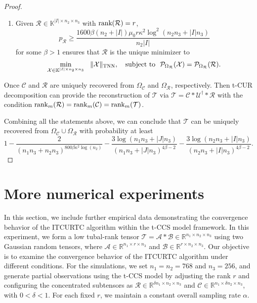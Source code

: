 \documentclass[twoside,12pt]{article}
\newcommand{\TNN}{\textnormal{TNN}}
\def\rank{\textnormal{rank}}
\def\rank{\textnormal{rank}}
\begin{document}
\begin{proof}
\begin{enumerate}[label=\roman*),leftmargin=.5in]
 \item Given $\mathcal{R}\in\mathbb{K}^{|I|\times n_2\times n_3}$ with $\rank(\mathcal{R})=r$, 
 \[p_{\mathcal{R}} \geq \frac{1600\beta(n_2+|I|)\mu_0r\kappa^2\log^2(n_2n_3+|I|n_3)}{n_2|I|}\] for some $\beta>1$ ensures that 
 $\mathcal{R}$ is the unique minimizer to 
\begin{align*}
\min_{\mathcal{X}\in\mathbb{K}^{|I|\times n_2\times n_3}}~~\|\mathcal{X}\|_{\TNN},~~\text { subject to }~ \mathcal{P}_{\Omega_{\mathcal{R}}}(\mathcal{X})=\mathcal{P}_{\Omega_{\mathcal{R}}}(\mathcal{R}).
\end{align*}
\end{enumerate}
Once $\mathcal{C}$ and $\mathcal{R}$ are uniquely recovered from $\Omega_\mathcal{C}$ and $\Omega_{\mathcal{R}}$, respectively. Then t-CUR decomposition can provide the reconstruction of $\mathcal{T}$ via $\mathcal{T}=\mathcal{C}*\mathcal{U}^\dagger*\mathcal{R}$ with the condition $\rank_m(\mathcal{R})=\rank_m(\mathcal{C})=\rank_m(\mathcal{T})$. 

Combining all the statements above, we can conclude that $\mathcal{T}$ can be uniquely recovered from $\Omega_{\mathcal{C}}\cup\Omega_{\mathcal{R}}$ with probability at least
\[
1-\frac{2}{(n_1n_3+n_2n_3)^{800\beta\kappa^2\log(n_2)}}-\frac{3\log(n_1n_3+|J|n_3)}{(n_1n_3+|J|n_3)^{4\beta-2}}-\frac{3\log(n_2n_3+|I|n_3)}{(n_2n_3+|I|n_3)^{4\beta-2}}.
\]
 \end{proof}
 \vspace{-25pt}
\section{More numerical experiments}\label{convergence_study}
In this section, we include further empirical data demonstrating the convergence behavior of the ITCURTC algorithm within the t-CCS model framework. In this experiment, we form a low tubal-rank tensor $\mathcal{T} = \mathcal{A} * \mathcal{B} \in \mathbb{R}^{n_1 \times n_2 \times n_3}$ using two Gaussian random tensors, where $\mathcal{A} \in \mathbb{R}^{n_1 \times r \times n_3}$ and $\mathcal{B} \in \mathbb{R}^{r \times n_2 \times n_3}$. Our objective is to examine the convergence behavior of the ITCURTC algorithm under different conditions. For the simulations, we set $n_1 = n_2 = 768$ and $n_3 = 256$, and generate partial observations using the t-CCS model by adjusting the rank $r$ and configuring the concentrated subtensors as $\mathcal{R} \in \mathbb{R}^{\delta n_1 \times n_2 \times n_3}$ and $\mathcal{C} \in \mathbb{R}^{n_1 \times \delta n_2 \times n_3}$, with $0 < \delta < 1$. For each  fixed $r$, we maintain a constant overall sampling rate $\alpha$.
\end{document}
